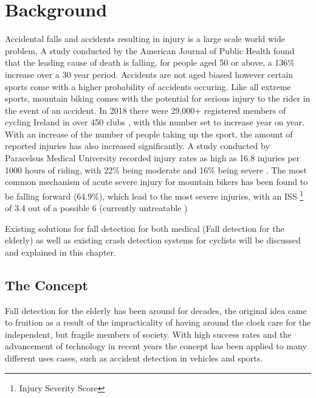 \chapter{Background}
Accidental falls and accidents resulting in injury is a large scale world wide problem, A study conducted by the American Journal of Public Health found that the leading cause of death is falling, for people aged 50 or above, a 136\% increase over a 30 year period\cite{fallDeaths}.  Accidents are not aged biased however certain sports come with a higher probability of accidents occuring.
Like all extreme sports, mountain biking comes with the potential for serious injury to the rider in the event of an accident. In 2018 there were 29,000+ registered members of cycling Ireland in over 450 clubs \cite{IT1} , with this number set to increase year on year. With an increase of the number of people taking up the sport, the amount of reported injuries has also increased significantly.  A study conducted by Paracelsus Medical University recorded injury rates as high as 16.8 injuries per 1000 hours of riding, with 22\% being moderate and 16\% being severe \cite{studyOfMTBInjuries}. The most common mechanism of acute severe injury for mountain bikers has been found to be  falling forward (64.9\%), which lead to the most severe injuries, with an ISS \footnote{ Injury Severity Score} of 3.4 out of a possible 6 (currently untreatable ) \cite{InjuryScale}


Existing solutions for fall detection for both medical (Fall detection for the elderly) as well as existing crash detection systems for cyclists will be discussed and explained in this chapter.

\newpage
\section{The Concept}

Fall detection for the elderly has been around for decades, the original idea came to fruition as a result of the impracticality of having around the clock care for the independent, but fragile members of society. With high success rates and the advancement of technology in recent years the concept has been applied to many different uses cases, such as accident detection in vehicles and sports. 


